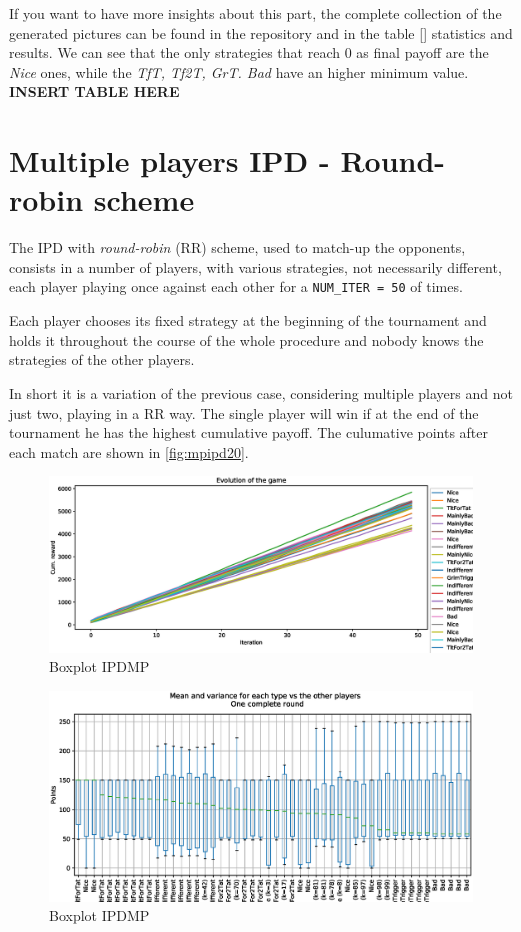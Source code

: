 \documentclass[journal,a4paper,10pt,twoside]{IEEEtran} %
\begin{document}
If you want to have more insights about this part, the complete collection of the generated pictures can be found in the repository and in the table \ref{} statistics and results. We can see that the only strategies that reach $0$ as final payoff are the \textit{Nice} ones, while the \textit{TfT, Tf2T, GrT. Bad} have an higher minimum value.
\textbf{INSERT TABLE HERE}


\section{Multiple players IPD - Round-robin scheme} \label{s:IPDMP}
The IPD with \textit{round-robin} (RR) scheme, used to match-up the opponents, consists in a number of players, with various strategies, not necessarily different, each player playing once against each other for a \texttt{NUM\_ITER = 50} of times. 

Each player chooses its fixed strategy at the beginning of the tournament and holds it throughout the course of the whole procedure and nobody knows the strategies of the other players.

In short it is a variation of the previous case, considering multiple players and not just two, playing in a RR way. The single player will win if at the end of the tournament he has the highest cumulative payoff. The culumative points after each match are shown in \autoref{fig:mpipd20}.

\begin{figure}[!ht]
    \centering
    \includegraphics[width=1\columnwidth]{../img/ipdmp/ipdmp-evolution-of-game-50}
    \caption{Boxplot IPDMP}
    \label{fig:boxIPDMP}
\end{figure}

\begin{figure}[!ht]
    \centering
    \includegraphics[width=1\columnwidth]{../img/ipdmp/ipdmp-boxplot-single-match-50}
    \caption{Boxplot IPDMP}
    \label{fig:boxIPDMP}
\end{figure}
\end{document}
